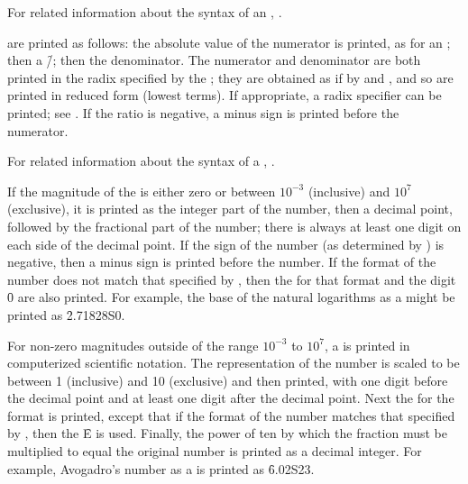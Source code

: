 For related information about the syntax of an ,
\seesection\SyntaxOfIntegers.

\endsubsubsubsection%

 are printed as follows:
the absolute value of the numerator is printed, as for an ;
then a \f{/}; then the denominator.  The numerator and denominator are
both printed in the radix specified by the ; 
they are obtained as if by
 and , and so 
are printed in reduced form (lowest terms).
If appropriate, a radix specifier can be printed; see 
.
If the ratio is negative, a minus sign is printed before the numerator.

For related information about the syntax of a ,
\seesection\SyntaxOfRatios.

\endsubsubsubsection%

If the magnitude of the  is either zero or between $10^{-3}$ (inclusive)
and $10^7$ (exclusive), it is printed as the integer part of the number,
then a decimal point,
followed by the fractional part of the number;
there is always at least one
digit on each side of the decimal point.    
If the sign of the number
(as determined by )
is negative, then a minus sign is printed before the number.
If the format of the number
does not match that specified by
, then the  for
that format and the digit \f{0} are also printed.
For example, the base of the natural logarithms as a 
might be printed as \f{2.71828S0}.

For non-zero magnitudes outside of the range $10^{-3}$ to $10^7$,
a  is printed in computerized scientific notation.
The representation of the number is scaled to be between
1 (inclusive) and 10 (exclusive) and then printed, with one digit
before the decimal point and at least one digit after the decimal point.
Next the  for the format is printed,
except that
if the format of the number matches that specified by 
, then the  \f{E}
is used.
Finally, the power of ten by which the fraction must be multiplied
to equal the original number is printed as a decimal integer.
For example, Avogadro's number as a  
is printed as \f{6.02S23}.


